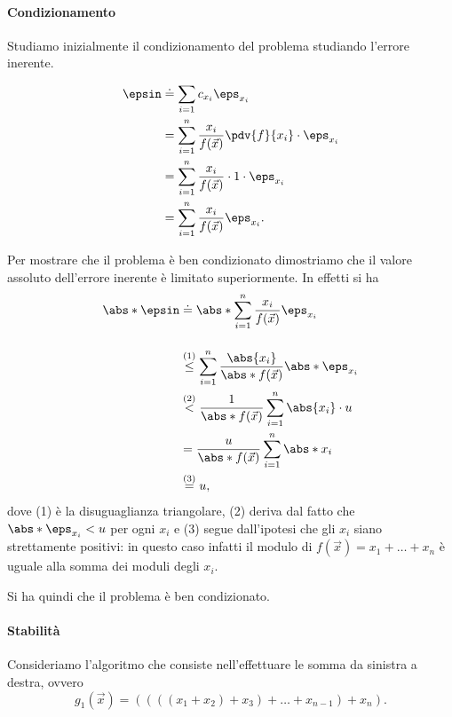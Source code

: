 \paragraph{Condizionamento} Studiamo inizialmente il condizionamento del problema studiando l'errore inerente.

\begin{align*}
    \epsin &\doteq \sum_{i=1} c_{x_i}\eps_{x_i} \\
    &= \sum_{i=1}^n \frac{x_i}{f(\vec{x})} \pdv{f}{x_i} \cdot \eps_{x_i}\\
    &= \sum_{i=1}^n \frac{x_i}{f(\vec{x})} \cdot 1 \cdot \eps_{x_i}\\
    &= \sum_{i=1}^n \frac{x_i}{f(\vec x)} \eps_{x_i}.
\end{align*}

Per mostrare che il problema è ben condizionato dimostriamo che il valore assoluto dell'errore inerente è limitato superiormente.
In effetti si ha
\begin{align*}
    \abs*{\epsin} &\doteq \abs*{\sum_{i=1}^n \frac{x_i}{f(\vec x)}\eps_{x_i}}\\[1.2em]
    &\stackrel{(1)}{\leq} \sum_{i=1}^n \frac{\abs{x_i}}{\abs*{f(\vec x)}}\abs*{\eps_{x_i}}\\
    &\stackrel{(2)}{<} \frac{1}{\abs*{f(\vec x)}} \sum_{i=1}^n \abs{x_i}\cdot u\\
    &= \frac{u}{\abs*{f(\vec x)}} \sum_{i=1}^n \abs*{x_i} \\
    &\stackrel{(3)}{=} u,
\end{align*} dove (1) è la disuguaglianza triangolare, (2) deriva dal fatto che $\abs*{\eps_{x_i}} < u$ per ogni $x_i$ e (3) segue dall'ipotesi che gli $x_i$ siano strettamente positivi: in questo caso infatti il modulo di $f(\vec x) = x_1 + \dots + x_n$ è uguale alla somma dei moduli degli $x_i$.

Si ha quindi che il problema è ben condizionato.

\paragraph{Stabilità} Consideriamo l'algoritmo che consiste nell'effettuare le somma da sinistra a destra, ovvero \[
    g_1(\vec x) = ((((x_1 + x_2) + x_3) + \dots + x_{n-1}) + x_n).
\]

